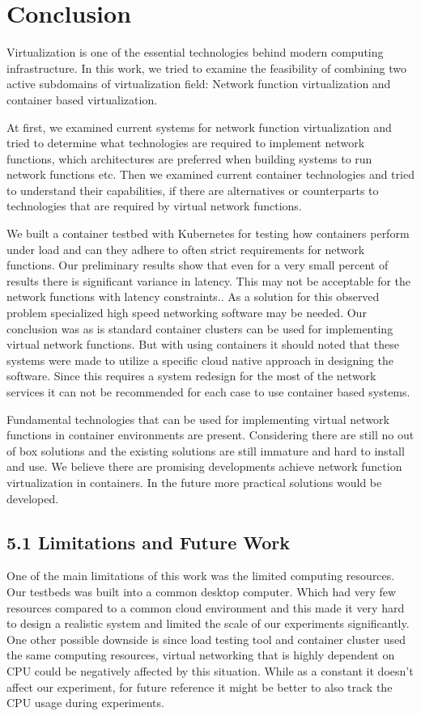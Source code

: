 \documentclass[12pt,oneandhalf,chaparabic,ceng,ms,eng,oneside,pntc]{gsufbe}
\begin{document}
\chapter{Conclusion}
Virtualization is one of the essential technologies behind modern computing infrastructure.  In this work, we
tried to examine the feasibility of combining two active subdomains of virtualization field:  Network
function virtualization and container based virtualization.

At first, we examined current systems for network function virtualization and tried to determine what
technologies are required to implement network functions, which architectures are preferred when
building systems to run network functions etc. Then we examined current container technologies and
tried to understand their capabilities, if there are alternatives or counterparts to technologies that
are required by virtual network functions.

We built a container testbed with Kubernetes for testing how containers perform under load and can they
adhere to often strict requirements for network functions.  Our preliminary results show that even for
a very small percent of results there is significant variance in latency. This may not be acceptable for
the network functions with latency constraints.. As a solution for this observed problem specialized
high speed networking software may be needed.
Our conclusion was as is standard container clusters can be used for implementing virtual network
functions. But with using containers it should noted that these systems were made to utilize a specific
cloud native approach in designing the software. Since
this requires a system redesign for the most of the network services it can not be recommended for each
case to use container based systems.

Fundamental technologies that can be used for implementing virtual network functions in
container environments are present.  Considering there are still no out of box solutions and the existing
solutions are still immature and hard to install and use.  We believe there are promising developments
achieve network
function virtualization in containers.  In the future more practical solutions would be developed.

\section[Limitations and Future Work]{5.1 Limitations and Future Work}
One of the main limitations of this work was the limited computing resources.  Our testbeds was 
built into a common desktop computer.  Which had very few resources compared to a common cloud
environment and this made it very hard to design a realistic system and limited the scale of our
experiments significantly. One other possible downside is since load testing tool and container cluster
used the same computing resources, virtual networking that is highly dependent on CPU could be negatively
affected by this situation. While as a constant it doesn't affect our experiment, for future reference it
might be better to also track the CPU usage during experiments.
\end{document}
